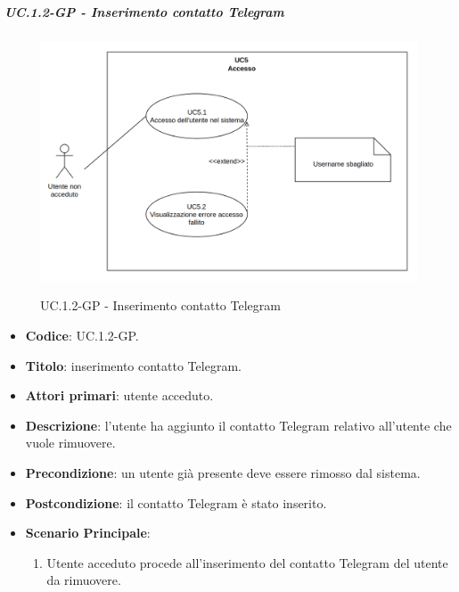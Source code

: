 				\subparagraph{UC\theuccount.1.2-GP - Inserimento contatto Telegram}
					\begin{figure}[H]
						\centering
						\includegraphics[width=\columnwidth]{img/UC5.png}\\
						\caption{UC\theuccount.1.2-GP - Inserimento contatto Telegram}
					\end{figure}
					\begin{itemize}
						\item \textbf{Codice}: UC\theuccount.1.2-GP.
						\item \textbf{Titolo}: inserimento contatto Telegram.
						\item \textbf{Attori primari}: utente acceduto.
						\item \textbf{Descrizione}: l'utente ha aggiunto il contatto Telegram relativo all'utente che vuole rimuovere.
						\item \textbf{Precondizione}: un utente già presente deve essere rimosso dal sistema.
						\item \textbf{Postcondizione}: il contatto Telegram è stato inserito.
						\item \textbf{Scenario Principale}:
						\begin{enumerate}
							\item Utente acceduto procede all'inserimento del contatto Telegram del utente da rimuovere.
						\end{enumerate}
					\end{itemize}

